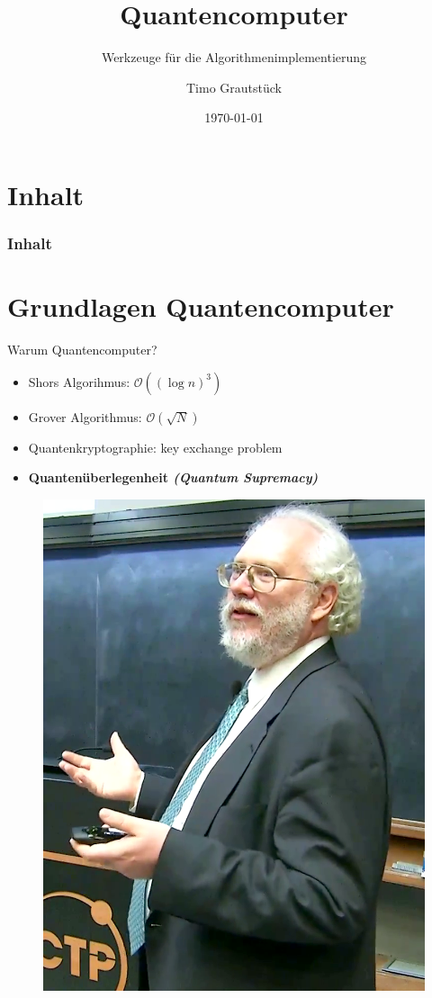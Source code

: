 \documentclass[compress,aspectratio=1610]{beamer}
\title{Quantencomputer}
\subtitle{Werkzeuge f\"ur die Algorithmenimplementierung}
\date{\today}
\author{Timo Grautst\"uck}
\institute[]{
  Fachhochschule Dortmund \\
  FB 10: Informationstechnik
}
\begin{document}
\maketitle

\section*{Inhalt}
\begin{frame}
  \frametitle{Inhalt}
  \centering
  \tableofcontents[hideallsubsections]
\end{frame}

\section{Grundlagen Quantencomputer}
\begin{frame}{Warum Quantencomputer?}
  \begin{minipage}{0.6\textwidth}
    \begin{itemize}
    \item Shors Algorihmus: $\mathcal{O}((\log n)^3)$
    \item Grover Algorithmus: $\mathcal{O}(\sqrt{N})$
    \item Quantenkryptographie: key exchange problem
    \item \textbf{Quanten\"uberlegenheit \textit{(Quantum Supremacy)}}
    \end{itemize}
  \end{minipage}
  \hfill
  \begin{minipage}{0.3\textwidth}
    \begin{figure}[h]
    \centering
    \includegraphics[width=1\textwidth]{figures/Peter_Shor_2017.png}

\end{figure}
\end{minipage}
\end{frame}
\end{document}
